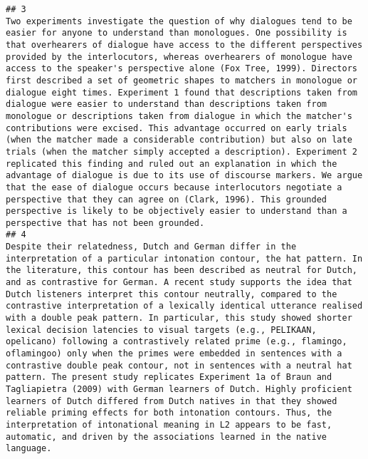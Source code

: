 \documentclass[
  english,
  man]{apa6}
\begin{document}
\begin{verbatim}
## 3                                                                                                                                                                                                                                                                                                                                                                                                                                        Two experiments investigate the question of why dialogues tend to be easier for anyone to understand than monologues. One possibility is that overhearers of dialogue have access to the different perspectives provided by the interlocutors, whereas overhearers of monologue have access to the speaker's perspective alone (Fox Tree, 1999). Directors first described a set of geometric shapes to matchers in monologue or dialogue eight times. Experiment 1 found that descriptions taken from dialogue were easier to understand than descriptions taken from monologue or descriptions taken from dialogue in which the matcher's contributions were excised. This advantage occurred on early trials (when the matcher made a considerable contribution) but also on late trials (when the matcher simply accepted a description). Experiment 2 replicated this finding and ruled out an explanation in which the advantage of dialogue is due to its use of discourse markers. We argue that the ease of dialogue occurs because interlocutors negotiate a perspective that they can agree on (Clark, 1996). This grounded perspective is likely to be objectively easier to understand than a perspective that has not been grounded.
## 4                                                                                                                                                                                                                                                                                                                                                                                                                                                                                                   Despite their relatedness, Dutch and German differ in the interpretation of a particular intonation contour, the hat pattern. In the literature, this contour has been described as neutral for Dutch, and as contrastive for German. A recent study supports the idea that Dutch listeners interpret this contour neutrally, compared to the contrastive interpretation of a lexically identical utterance realised with a double peak pattern. In particular, this study showed shorter lexical decision latencies to visual targets (e.g., PELIKAAN, opelicano) following a contrastively related prime (e.g., flamingo, oflamingoo) only when the primes were embedded in sentences with a contrastive double peak contour, not in sentences with a neutral hat pattern. The present study replicates Experiment 1a of Braun and Tagliapietra (2009) with German learners of Dutch. Highly proficient learners of Dutch differed from Dutch natives in that they showed reliable priming effects for both intonation contours. Thus, the interpretation of intonational meaning in L2 appears to be fast, automatic, and driven by the associations learned in the native language.

\end{verbatim}
\end{document}
